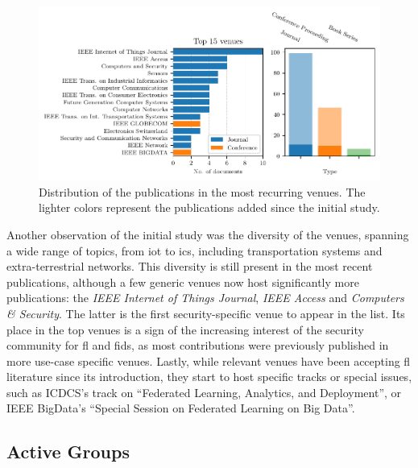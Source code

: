 \begin{figure}
  \centering
  \includegraphics[width=\textwidth]{figures/venues_histogram.pdf}

  \caption{
    Distribution of the publications in the most recurring venues.
    The lighter colors represent the publications added since the initial study.
    \label{fig:sota.venues}
  }
\end{figure}

Another observation of the initial study was the diversity of the venues, spanning a wide range of topics, from \gls{iot} to \gls{ics}, including transportation systems and extra-terrestrial networks.
This diversity is still present in the most recent publications, although a few generic venues now host significantly more publications: the \emph{IEEE Internet of Things Journal}, \emph{IEEE Access} and \emph{Computers \& Security}.
The latter is the first security-specific venue to appear in the list.
Its place in the top venues is a sign of the increasing interest of the security community for \gls{fl} and \gls{fids}, as most contributions were previously published in more use-case specific venues.
Lastly, while relevant venues have been accepting \gls{fl} literature since its introduction, they start to host specific tracks or special issues, such as ICDCS's track on ``Federated Learning, Analytics, and Deployment'', or IEEE BigData's ``Special Session on Federated Learning on Big Data''.


\subsection{Active Groups\label{sec:sota.quanti.authors}}

